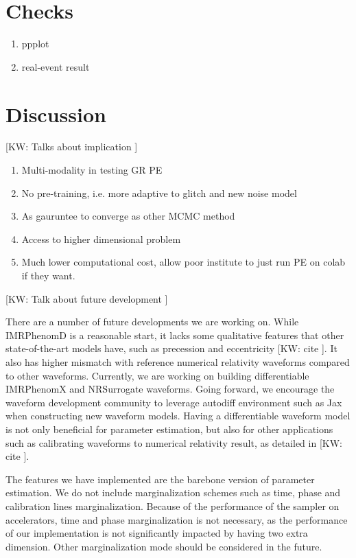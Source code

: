 \documentclass[twocolumn]{aastex631}
\newcommand{\kw}[1]{{\color{rb4}[KW: #1 ]}}
\begin{document}
\section{Checks}

\begin{enumerate}
    \item ppplot
    \item real-event result
\end{enumerate}

\section{Discussion}

\kw{Talks about implication}
\begin{enumerate}
    \item Multi-modality in testing GR PE
    \item No pre-training, i.e. more adaptive to glitch and new noise model
    \item As gauruntee to converge as other MCMC method
    \item Access to higher dimensional problem
    \item Much lower computational cost, allow poor institute to just run PE on colab if they want.
\end{enumerate}

\kw{Talk about future development}


There are a number of future developments we are working on. While IMRPhenomD is
a reasonable start, it lacks some qualitative features that other
state-of-the-art models have, such as precession and eccentricity \kw{cite}. It
also has higher mismatch with reference numerical relativity waveforms compared
to other waveforms. Currently, we are working on building differentiable
IMRPhenomX and NRSurrogate waveforms. Going forward, we encourage the waveform
development community to leverage autodiff environment such as Jax when
constructing new waveform models. Having a differentiable waveform model is not
only beneficial for parameter estimation, but also for other applications such
as calibrating waveforms to numerical relativity result, as detailed in
\kw{cite}.

The features we have implemented are the barebone version of parameter
estimation. We do not include marginalization schemes such as time, phase and
calibration lines marginalization. Because of the performance of the sampler on
accelerators, time and phase marginalization is not necessary, as the
performance of our implementation is not significantly impacted by having two
extra dimension. Other marginalization mode should be considered in the future.
\end{document}
